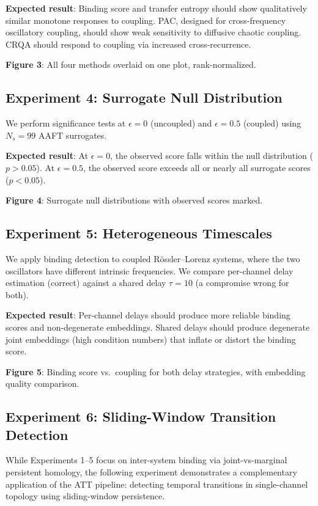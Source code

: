 \documentclass[11pt,a4paper]{article}
\begin{document}
\textbf{Expected result}: Binding score and transfer entropy should show qualitatively similar monotone responses to coupling.
PAC, designed for cross-frequency oscillatory coupling, should show weak sensitivity to diffusive chaotic coupling.
CRQA should respond to coupling via increased cross-recurrence.

\textbf{Figure 3}: All four methods overlaid on one plot, rank-normalized.

\subsection{Experiment 4: Surrogate Null Distribution}\label{sec:exp-surrogate}

We perform significance tests at $\epsilon = 0$ (uncoupled) and $\epsilon = 0.5$ (coupled) using $N_s = 99$ AAFT surrogates.

\textbf{Expected result}: At $\epsilon = 0$, the observed score falls within the null distribution ($p > 0.05$).
At $\epsilon = 0.5$, the observed score exceeds all or nearly all surrogate scores ($p < 0.05$).

\textbf{Figure 4}: Surrogate null distributions with observed scores marked.

\subsection{Experiment 5: Heterogeneous Timescales}\label{sec:exp-hetero}

We apply binding detection to coupled R\"ossler--Lorenz systems, where the two oscillators have different intrinsic frequencies.
We compare per-channel delay estimation (correct) against a shared delay $\tau = 10$ (a compromise wrong for both).

\textbf{Expected result}: Per-channel delays should produce more reliable binding scores and non-degenerate embeddings.
Shared delays should produce degenerate joint embeddings (high condition numbers) that inflate or distort the binding score.

\textbf{Figure 5}: Binding score vs.\ coupling for both delay strategies, with embedding quality comparison.

\subsection{Experiment 6: Sliding-Window Transition Detection}\label{sec:exp-transitions}

While Experiments 1--5 focus on inter-system binding via joint-vs-marginal persistent homology, the following experiment demonstrates a complementary application of the ATT pipeline: detecting temporal transitions in single-channel topology using sliding-window persistence.
\end{document}
